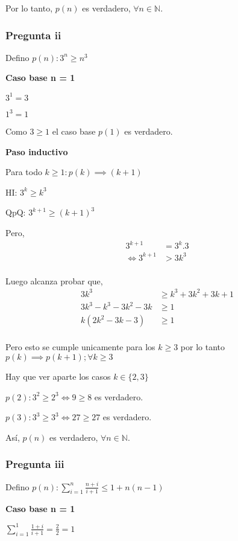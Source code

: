 Por lo tanto, $p(n)$ es verdadero, $\forall n \in \mathbb{N}$.

\subsubsection{Pregunta ii}

Defino $ p(n): 3^n \geq n^3$

\textbf{Caso base n = 1}

$ 3^1 = 3 $

$ 1^3 = 1 $

Como $ 3 \geq 1 $ el caso base $p(1)$ es verdadero.

\textbf{Paso inductivo}

Para todo $k \geq 1: p(k) \implies (k+1)$

HI: $ 3^k \geq k^3$

QpQ: $ 3^{k+1} \geq (k+1)^3$

Pero,
\begin{align*}
    3^{k+1} &= 3^k . 3 \\
    \iff 3^{k+1} &> 3k^3 \\
\end{align*}

Luego alcanza probar que,
\begin{align*}
    3k^3 &\geq k^3 + 3k^2 + 3k + 1 \\
    3k^3 - k^3 - 3k^2 - 3k &\geq 1 \\
    k(2k^2 - 3k -3) &\geq 1 \\
\end{align*}

Pero esto se cumple unicamente para los $k \geq 3$ por lo tanto $p(k) \implies p(k+1); \forall k \geq 3$

Hay que ver aparte los casos $k \in \{ 2,3 \}$

$p(2): 3^2 \geq 2^3 \iff 9 \geq 8$ es verdadero.

$p(3): 3^3 \geq 3^3 \iff 27 \geq 27$ es verdadero.

Así, $p(n)$ es verdadero, $\forall n \in \mathbb{N}$.

\subsubsection{Pregunta iii}

Defino $ p(n): \sum_{i=1}^{n}\frac{n+i}{i+1} \leq 1+n(n-1)$

\textbf{Caso base n = 1}

$ \sum_{i=1}^{1}\frac{1+i}{i+1} = \frac{2}{2} = 1 $

